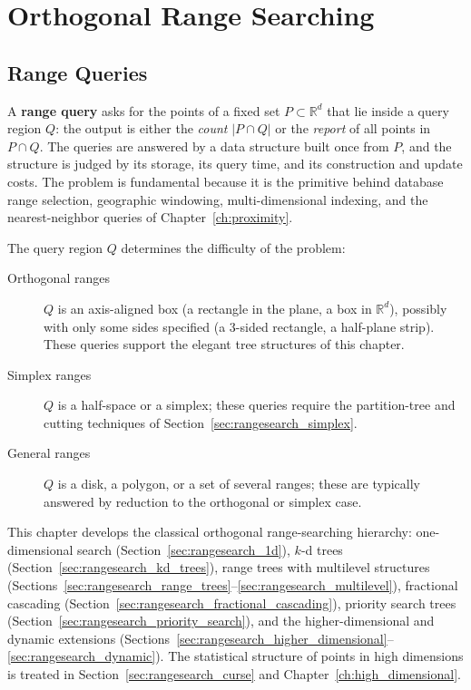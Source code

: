 \chapter{Orthogonal Range Searching}
\label{ch:range_searching}

\section{Range Queries}
\label{sec:rangesearch_queries}

A \textbf{range query} asks for the points of a fixed set
$P \subset \mathbb{R}^d$ that lie inside a query region $Q$: the output is
either the \emph{count} $|P \cap Q|$ or the \emph{report} of all points in
$P \cap Q$. The queries are answered by a data structure built once from
$P$, and the structure is judged by its storage, its query time, and its
construction and update costs. The problem is fundamental because it is the
primitive behind database range selection, geographic windowing,
multi-dimensional indexing, and the nearest-neighbor queries of
Chapter~\ref{ch:proximity}.

The query region $Q$ determines the difficulty of the problem:
\begin{description}
  \item[Orthogonal ranges] $Q$ is an axis-aligned box (a rectangle in the
    plane, a box in $\mathbb{R}^d$), possibly with only some sides
    specified (a 3-sided rectangle, a half-plane strip). These queries
    support the elegant tree structures of this chapter.
  \item[Simplex ranges] $Q$ is a half-space or a simplex; these queries
    require the partition-tree and cutting techniques of
    Section~\ref{sec:rangesearch_simplex}.
  \item[General ranges] $Q$ is a disk, a polygon, or a set of several
    ranges; these are typically answered by reduction to the orthogonal or
    simplex case.
\end{description}

This chapter develops the classical orthogonal range-searching hierarchy:
one-dimensional search (Section~\ref{sec:rangesearch_1d}), $k$-d trees
(Section~\ref{sec:rangesearch_kd_trees}), range trees with multilevel
structures (Sections~\ref{sec:rangesearch_range_trees}--\ref{sec:rangesearch_multilevel}),
fractional cascading (Section~\ref{sec:rangesearch_fractional_cascading}),
priority search trees (Section~\ref{sec:rangesearch_priority_search}), and
the higher-dimensional and dynamic extensions
(Sections~\ref{sec:rangesearch_higher_dimensional}--\ref{sec:rangesearch_dynamic}).
The statistical structure of points in high dimensions is treated in
Section~\ref{sec:rangesearch_curse} and
Chapter~\ref{ch:high_dimensional}.

